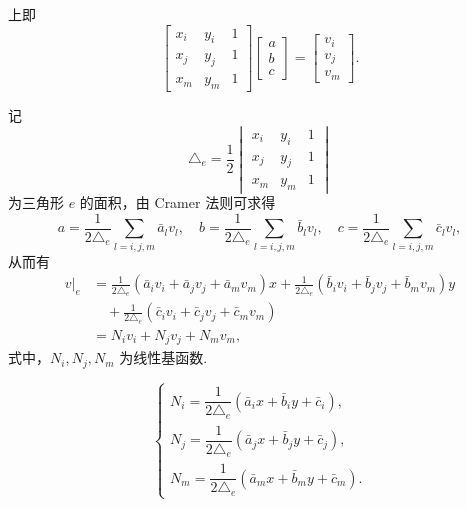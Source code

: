 上即
\begin{equation*}
\begin{bmatrix}
x_i & y_i & 1 \\
x_j & y_j & 1 \\
x_m & y_m & 1
\end{bmatrix}
\begin{bmatrix}
a \\ b \\ c
\end{bmatrix}
=
\begin{bmatrix}
v_i \\ v_j \\ v_m
\end{bmatrix}.
\end{equation*}

记
\begin{equation*}
\triangle_e = \frac{1}{2}
\begin{vmatrix}
x_i & y_i & 1 \\
x_j & y_j & 1 \\
x_m & y_m & 1
\end{vmatrix}
\end{equation*}
为三角形 $e$ 的面积，由 Cramer 法则可求得
\begin{equation*}
a = \frac{1}{2\triangle_e}\sum_{l=i,j,m}\bar{a}_l v_l, \quad
b = \frac{1}{2\triangle_e}\sum_{l=i,j,m}\bar{b}_l v_l, \quad
c = \frac{1}{2\triangle_e}\sum_{l=i,j,m}\bar{c}_l v_l,
\end{equation*}
从而有
\begin{align*}
v|_e &= \frac{1}{2\triangle_e}(\bar{a}_i v_i + \bar{a}_j v_j + \bar{a}_m v_m)x + \frac{1}{2\triangle_e}(\bar{b}_i v_i + \bar{b}_j v_j + \bar{b}_m v_m)y \\
&\quad + \frac{1}{2\triangle_e}(\bar{c}_i v_i + \bar{c}_j v_j + \bar{c}_m v_m) \\
&= N_i v_i + N_j v_j + N_m v_m,
\end{align*}
式中，$N_i, N_j, N_m$ 为线性基函数.\par

\begin{equation*}
\begin{cases}
N_i = \dfrac{1}{2\triangle_e}(\bar{a}_i x + \bar{b}_i y + \bar{c}_i), \\[6pt]
N_j = \dfrac{1}{2\triangle_e}(\bar{a}_j x + \bar{b}_j y + \bar{c}_j), \\[6pt]
N_m = \dfrac{1}{2\triangle_e}(\bar{a}_m x + \bar{b}_m y + \bar{c}_m).
\end{cases}
\end{equation*}

